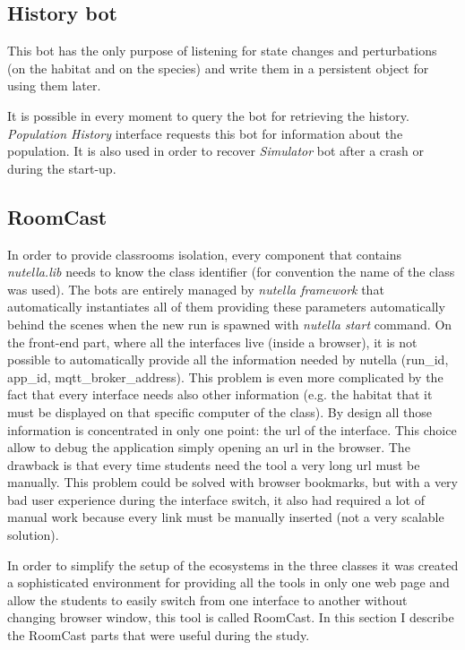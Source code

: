 \subsection{History bot}
This bot has the only purpose of listening for state changes and perturbations (on the habitat and on the species) and write them in a persistent object for using them later.

It is possible in every moment to query the bot for retrieving the history. \textit{Population History} interface requests this bot for information about the population. It is also used in order to recover \textit{Simulator} bot after a crash or during the start-up.

\subsection{RoomCast}
In order to provide classrooms isolation, every component that contains \textit{nutella.lib} needs to know the class identifier (for convention the name of the class was used). The bots are entirely managed by \textit{nutella framework} that automatically instantiates all of them providing these parameters automatically behind the scenes when the new run is spawned with \textit{nutella start} command. On the front-end part, where all the interfaces live (inside a browser), it is not possible to automatically provide all the information needed by nutella (run\_id, app\_id, mqtt\_broker\_address). This problem is even more complicated by the fact that every interface needs also other information (e.g. the habitat that it must be displayed on that specific computer of the class). By design all those information is concentrated in only one point: the url of the interface. This choice allow to debug the application simply opening an url in the browser. The drawback is that every time students need the tool a very long url must be manually. This problem could be solved with browser bookmarks, but with a very bad user experience during the interface switch, it also had required a lot of manual work because every link must be manually inserted (not a very scalable solution).

In order to simplify the setup of the ecosystems in the three classes it was created a sophisticated environment for providing all the tools in only one web page and allow the students to easily switch from one interface to another without changing browser window, this tool is called RoomCast. In this section I describe the RoomCast parts that were useful during the study.

